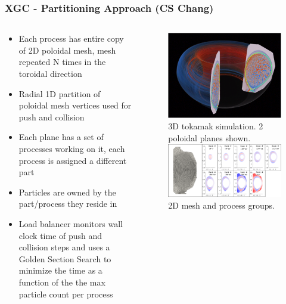\documentclass[aspectratio=169]{beamer}
\begin{document}
\begin{frame}
  \frametitle{XGC - Partitioning Approach (CS Chang)}
  \begin{columns}
    \begin{column}{0.5\textwidth}
      \begin{itemize}
        \item Each process has entire copy of 2D poloidal mesh, mesh repeated N
          times in the toroidal direction
        \item Radial 1D partition of poloidal mesh vertices used for push and collision
        \item Each plane has a set of processes working on it, each process is
          assigned a different part
        \item Particles are owned by the part/process they reside in
        \item Load balancer monitors wall clock time of push and collision steps
          and uses a Golden Section Search to minimize the time as a function of
          the the max particle count per process
      \end{itemize}
    \end{column}
    \begin{column}{0.5\textwidth}
      \begin{figure}
        \centering
        \includegraphics[width=.5\textwidth]{figures/xgcTokamakSimulation.png} \\
        \small{3D tokamak simulation.  2 poloidal planes shown.}
        \includegraphics[width=.85\textwidth]{figures/xgcMeshDistribution.png} \\
        \small{2D mesh and process groups.}
      \end{figure}
    \end{column}
  \end{columns}
\end{frame}
\end{document}
